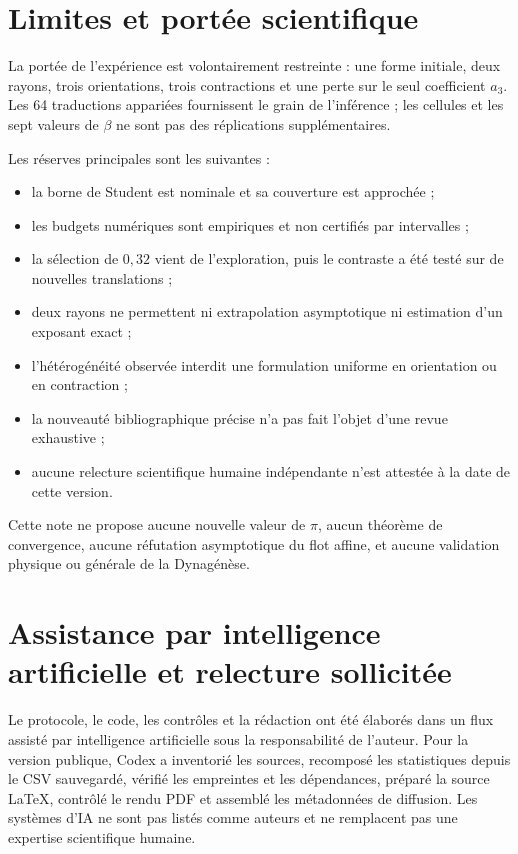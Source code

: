 \documentclass[11pt,a4paper]{article}
\begin{document}
\section{Limites et portée scientifique}

La portée de l'expérience est volontairement restreinte : une forme initiale, deux rayons, trois orientations, trois contractions et une perte sur le seul coefficient $a_3$. Les 64 traductions appariées fournissent le grain de l'inférence ; les cellules et les sept valeurs de $\beta$ ne sont pas des réplications supplémentaires.

Les réserves principales sont les suivantes :
\begin{itemize}
  \item la borne de Student est nominale et sa couverture est approchée ;
  \item les budgets numériques sont empiriques et non certifiés par intervalles ;
  \item la sélection de $0{,}32$ vient de l'exploration, puis le contraste a été testé sur de nouvelles translations ;
  \item deux rayons ne permettent ni extrapolation asymptotique ni estimation d'un exposant exact ;
  \item l'hétérogénéité observée interdit une formulation uniforme en orientation ou en contraction ;
  \item la nouveauté bibliographique précise n'a pas fait l'objet d'une revue exhaustive ;
  \item aucune relecture scientifique humaine indépendante n'est attestée à la date de cette version.
\end{itemize}

Cette note ne propose aucune nouvelle valeur de $\pi$, aucun théorème de convergence, aucune réfutation asymptotique du flot affine, et aucune validation physique ou générale de la Dynagénèse.

\section{Assistance par intelligence artificielle et relecture sollicitée}

Le protocole, le code, les contrôles et la rédaction ont été élaborés dans un flux assisté par intelligence artificielle sous la responsabilité de l'auteur. Pour la version publique, Codex a inventorié les sources, recomposé les statistiques depuis le CSV sauvegardé, vérifié les empreintes et les dépendances, préparé la source LaTeX, contrôlé le rendu PDF et assemblé les métadonnées de diffusion. Les systèmes d'IA ne sont pas listés comme auteurs et ne remplacent pas une expertise scientifique humaine.
\end{document}
